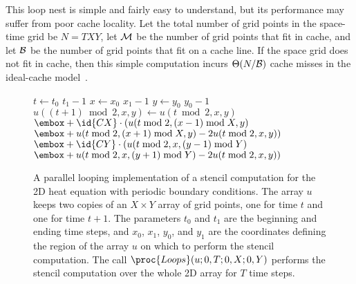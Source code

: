 This loop nest is simple and fairly easy to understand, but its
performance may suffer from poor cache locality.  Let the total number
of grid points in the space-time grid be $N=TXY$, let $\cal M$ be the
number of grid points that fit in cache, and let $\cal B$ be the
number of grid points that fit on a cache line.  If the space grid
does not fit in cache, then this simple computation incurs
$\Theta(N/\cal B)$ cache misses in the ideal-cache
model~\cite{FrigoLePr99}.

\begin{figure}
\small
\begin{codebox}
\li       \For $t \gets t_0$ \To $t_1-1$ 
\li          \Do \Parfor $x \gets x_0$ \To $x_1-1$
\li             \Do \Parfor $y \gets y_0$ \To $y_0-1$
\li                 \Do $u((t+1)\bmod 2,x,y) \gets u(t\bmod 2,x,y) $
\zi  $\embox + \id{CX}\cdot ( u(t\bmod 2, (x-1)\bmod X, y) $
\zi  $\embox + u(t\bmod 2, (x+1)\bmod X, y) -2 u (t\bmod 2, x, y) ) $
\zi  $\embox + \id{CY}\cdot ( u(t\bmod 2, x, (y-1)\bmod Y) $
\zi  $\embox + u(t\bmod 2, x, (y+1)\bmod Y) -2u(t\bmod 2, x, y) )$
\End\End\End
\end{codebox}

\caption{A parallel looping implementation of a stencil computation
  for the 2D heat equation with periodic boundary conditions.  The
  array $u$ keeps two copies of an $X\times Y$ array of grid points,
  one for time $t$ and one for time $t+1$.  The parameters $t_0$ and
  $t_1$ are the beginning and ending time steps, and $x_0$, $x_1$,
  $y_0$, and $y_1$ are the coordinates defining the region of the
  array $u$ on which to perform the stencil computation.  The call
  $\proc{Loops}(u; 0, T; 0, X; 0, Y)$ performs the stencil computation
  over the whole 2D array for $T$ time steps.}
\label{fig:loops-code}
\end{figure}


